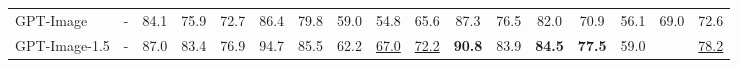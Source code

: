 \begin{table}[t]
{\begin{tabular}{lcccccccccccccccc}
GPT-Image                        & -                                  & 84.1                                 & 75.9                                 & 72.7                                 & 86.4                                 & \cellcolor[HTML]{E2E2E2}79.8                                 & 59.0                                 & 54.8                                 & 65.6                                 & 87.3                                 & 76.5                                 & 82.0                                 & 70.9                                 & 56.1                                 & \cellcolor[HTML]{E2E2E2}69.0                                 & 72.6                                 \\
GPT-Image-1.5                    & -                                  & 87.0                                 & 83.4                                 & 76.9                                 & 94.7                                 & \cellcolor[HTML]{E2E2E2}85.5                                 & 62.2                                 & {\color[HTML]{319B62} \underline{67.0}}    & {\color[HTML]{319B62} \underline{72.2}}    & {\color[HTML]{319B62} \textbf{90.8}} & 83.9                                 & {\color[HTML]{319B62} \textbf{84.5}} & {\color[HTML]{319B62} \textbf{77.5}} & 59.0                                 & \cellcolor[HTML]{E2E2E2}{\color[HTML]{319B62} \underline{74.6}}    & {\color[HTML]{319B62} \underline{78.2}}    \\ \bottomrule
\end{tabular}
}
\vspace{-3mm}
\label{table:main}
\end{table}

